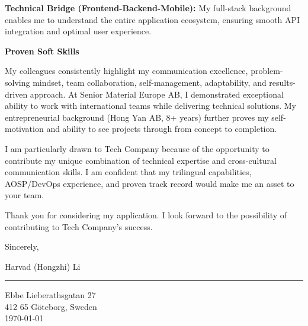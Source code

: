 \documentclass[a4paper,10pt]{article}
\begin{document}
\textbf{Technical Bridge (Frontend-Backend-Mobile):} My full-stack background enables me to understand the entire application ecosystem, ensuring smooth API integration and optimal user experience.

\textbf{Proven Soft Skills}

My colleagues consistently highlight my communication excellence, problem-solving mindset, team collaboration, self-management, adaptability, and results-driven approach. At Senior Material Europe AB, I demonstrated exceptional ability to work with international teams while delivering technical solutions. My entrepreneurial background (Hong Yan AB, 8+ years) further proves my self-motivation and ability to see projects through from concept to completion.

I am particularly drawn to Tech Company because of the opportunity to contribute my unique combination of technical expertise and cross-cultural communication skills. I am confident that my trilingual capabilities, AOSP/DevOps experience, and proven track record would make me an asset to your team.

Thank you for considering my application. I look forward to the possibility of contributing to Tech Company's success.

\vspace{10pt}

Sincerely,

\vspace{15pt}

Harvad (Hongzhi) Li

\vspace{20pt}

{\color{linkedinblue}\rule{\linewidth}{0.6pt}}

\vspace{4pt}

{\color{linkedinblue}
Ebbe Lieberathsgatan 27\\
412 65 Göteborg, Sweden\\
\today}
\end{document}
